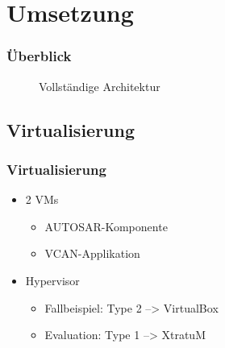\documentclass[]{beamer}
\newcommand{\inputImage}[1]{}
\begin{document}
\section{Umsetzung}
\label{sec:umsetzung}

\begin{frame}
\frametitle{Überblick}
    \begin{figure}[ht]
        \centering
        \resizebox{0.8\linewidth}{!}{\inputImage{arch_finished.dia}}
        \caption{Vollständige Architektur}
        \label{fig:arch_finished}
    \end{figure}
\end{frame}




\subsection{Virtualisierung}
\begin{frame}
\frametitle{Virtualisierung}
    \begin{itemize}
        \item 2 VMs
        \begin{itemize}
            \item AUTOSAR-Komponente
            \item VCAN-Applikation
        \end{itemize}
        \item Hypervisor
        \begin{itemize}
            \item Fallbeispiel: Type 2 --> VirtualBox
            \item Evaluation: Type 1 --> XtratuM
        \end{itemize}
    \end{itemize}
\end{frame}




\end{document}
